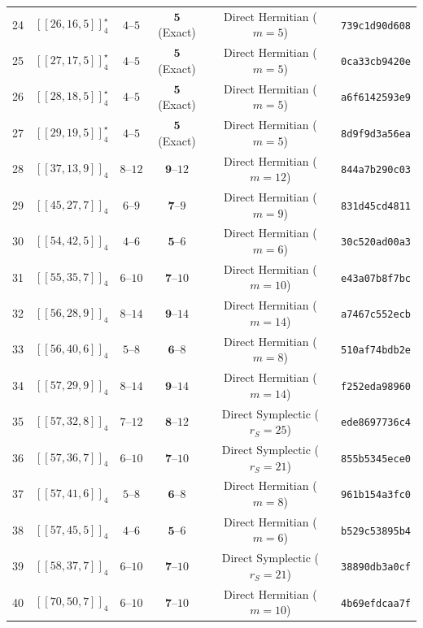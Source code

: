 \documentclass[11pt,a4paper]{article}
\theoremstyle{remark}
\begin{document}
{\begin{longtable}{@{}rccccl@{}}
24 & $[[26,16,5]]_{4}^\star$ & $4\text{--}5$ & $\mathbf{5}$ (Exact) & Direct Hermitian ($m=5$) & \texttt{739c1d90d608} \\
25 & $[[27,17,5]]_{4}^\star$ & $4\text{--}5$ & $\mathbf{5}$ (Exact) & Direct Hermitian ($m=5$) & \texttt{0ca33cb9420e} \\
26 & $[[28,18,5]]_{4}^\star$ & $4\text{--}5$ & $\mathbf{5}$ (Exact) & Direct Hermitian ($m=5$) & \texttt{a6f6142593e9} \\
27 & $[[29,19,5]]_{4}^\star$ & $4\text{--}5$ & $\mathbf{5}$ (Exact) & Direct Hermitian ($m=5$) & \texttt{8d9f9d3a56ea} \\
28 & $[[37,13,9]]_{4}$ & $8\text{--}12$ & $\mathbf{9}\text{--}12$ & Direct Hermitian ($m=12$) & \texttt{844a7b290c03} \\
29 & $[[45,27,7]]_{4}$ & $6\text{--}9$ & $\mathbf{7}\text{--}9$ & Direct Hermitian ($m=9$) & \texttt{831d45cd4811} \\
30 & $[[54,42,5]]_{4}$ & $4\text{--}6$ & $\mathbf{5}\text{--}6$ & Direct Hermitian ($m=6$) & \texttt{30c520ad00a3} \\
31 & $[[55,35,7]]_{4}$ & $6\text{--}10$ & $\mathbf{7}\text{--}10$ & Direct Hermitian ($m=10$) & \texttt{e43a07b8f7bc} \\
32 & $[[56,28,9]]_{4}$ & $8\text{--}14$ & $\mathbf{9}\text{--}14$ & Direct Hermitian ($m=14$) & \texttt{a7467c552ecb} \\
33 & $[[56,40,6]]_{4}$ & $5\text{--}8$ & $\mathbf{6}\text{--}8$ & Direct Hermitian ($m=8$) & \texttt{510af74bdb2e} \\
34 & $[[57,29,9]]_{4}$ & $8\text{--}14$ & $\mathbf{9}\text{--}14$ & Direct Hermitian ($m=14$) & \texttt{f252eda98960} \\
35 & $[[57,32,8]]_{4}$ & $7\text{--}12$ & $\mathbf{8}\text{--}12$ & Direct Symplectic ($r_S=25$) & \texttt{ede8697736c4} \\
36 & $[[57,36,7]]_{4}$ & $6\text{--}10$ & $\mathbf{7}\text{--}10$ & Direct Symplectic ($r_S=21$) & \texttt{855b5345ece0} \\
37 & $[[57,41,6]]_{4}$ & $5\text{--}8$ & $\mathbf{6}\text{--}8$ & Direct Hermitian ($m=8$) & \texttt{961b154a3fc0} \\
38 & $[[57,45,5]]_{4}$ & $4\text{--}6$ & $\mathbf{5}\text{--}6$ & Direct Hermitian ($m=6$) & \texttt{b529c53895b4} \\
39 & $[[58,37,7]]_{4}$ & $6\text{--}10$ & $\mathbf{7}\text{--}10$ & Direct Symplectic ($r_S=21$) & \texttt{38890db3a0cf} \\
40 & $[[70,50,7]]_{4}$ & $6\text{--}10$ & $\mathbf{7}\text{--}10$ & Direct Hermitian ($m=10$) & \texttt{4b69efdcaa7f} \\

\end{longtable}}
\end{document}
